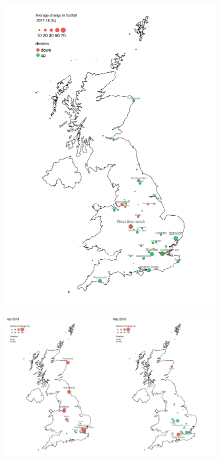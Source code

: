 \begin{figure}
  \includegraphics[trim={0 0 0 0},clip]{images/applications-cities-rank.png}
  \caption{}
  \label{}
\end{figure}

\begin{figure}
  \includegraphics[trim={0 0 0 0},clip]{images/applications-city-indices.png}
  \caption{}
  \label{}
\end{figure}

